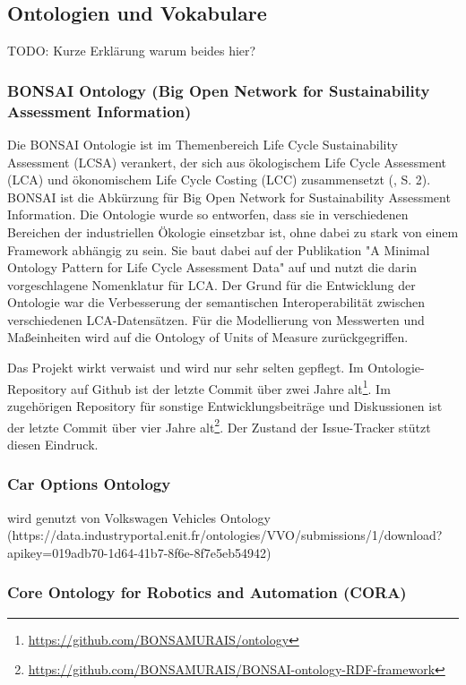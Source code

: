 \documentclass{article}
\begin{document}
\subsection{Ontologien und Vokabulare}

TODO: Kurze Erklärung warum beides hier?

\subsubsection{BONSAI Ontology (Big Open Network for Sustainability Assessment Information)}

Die BONSAI Ontologie ist im Themenbereich Life Cycle Sustainability Assessment (LCSA) verankert, der sich aus ökologischem Life Cycle Assessment (LCA) und ökonomischem Life Cycle Costing (LCC) zusammensetzt (\cite{ghose2022core}, S. 2).
BONSAI ist die Abkürzung für Big Open Network for Sustainability Assessment Information.
Die Ontologie wurde so entworfen, dass sie in verschiedenen Bereichen der industriellen Ökologie einsetzbar ist, ohne dabei zu stark von einem Framework abhängig zu sein.
Sie baut dabei auf der Publikation "A Minimal Ontology Pattern for Life Cycle Assessment Data" \cite{vardem2015anminimal} auf und nutzt die darin vorgeschlagene Nomenklatur für LCA.
Der Grund für die Entwicklung der Ontologie war die Verbesserung der semantischen Interoperabilität zwischen verschiedenen LCA-Datensätzen.
Für die Modellierung von Messwerten und Maßeinheiten wird auf die Ontology of Units of Measure \cite{rijgersberg2013ontology} zurückgegriffen.

Das Projekt wirkt verwaist und wird nur sehr selten gepflegt. Im Ontologie-Repository auf Github ist der letzte Commit über zwei Jahre alt\footnote{\url{https://github.com/BONSAMURAIS/ontology}}. Im zugehörigen Repository für sonstige Entwicklungsbeiträge und Diskussionen ist der letzte Commit über vier Jahre alt\footnote{\url{https://github.com/BONSAMURAIS/BONSAI-ontology-RDF-framework}}. Der Zustand der Issue-Tracker stützt diesen Eindruck.

\subsubsection{Car Options Ontology}

wird genutzt von Volkswagen Vehicles Ontology (https://data.industryportal.enit.fr/ontologies/VVO/submissions/1/download?apikey=019adb70-1d64-41b7-8f6e-8f7e5eb54942)

\subsubsection{Core Ontology for Robotics and Automation (CORA)}
\end{document}
